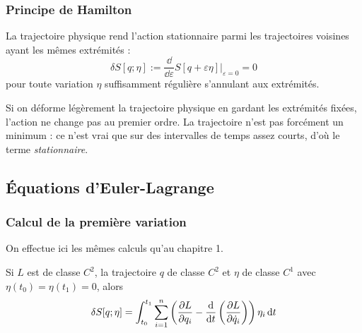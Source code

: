 \subsubsection{Principe de Hamilton}
\begin{theoreme}
    La trajectoire physique rend l'action stationnaire parmi les
    trajectoires voisines ayant les mêmes extrémités :
    \[
        \delta S[q;\eta] := \frac{\dd}{\dd\varepsilon}
        S[q + \varepsilon\eta]\Big|_{\varepsilon=0} = 0
    \]
    pour toute variation $\eta$ suffisamment régulière s'annulant aux
    extrémités.
\end{theoreme}

\begin{note}
    Si on déforme légèrement la trajectoire physique en gardant les
    extrémités fixées, l'action ne change pas au premier ordre. La
    trajectoire n'est pas forcément un minimum : ce n'est vrai que sur
    des intervalles de temps assez courts, d'où le terme
    \emph{stationnaire}.
\end{note}

\subsection{Équations d'Euler-Lagrange}

\subsubsection{Calcul de la première variation}

On effectue ici les mêmes calculs qu'au chapitre 1.

\begin{proposition}
    Si $L$ est de classe $C^2$, la trajectoire $q$ de classe $C^2$ et
    $\eta$ de classe $C^1$ avec $\eta(t_0) = \eta(t_1) = 0$, alors
    \[
        \delta S[q;\eta] = \int_{t_0}^{t_1}\sum_{i=1}^{n}
        \left(\frac{\partial L}{\partial q_i} - \frac{\mathrm{d}}{\mathrm{d} t}\left(\frac{\partial L}{\partial \dot q_i}\right)\right)
        \eta_i\,\mathrm{d} t
    \]
\end{proposition}

